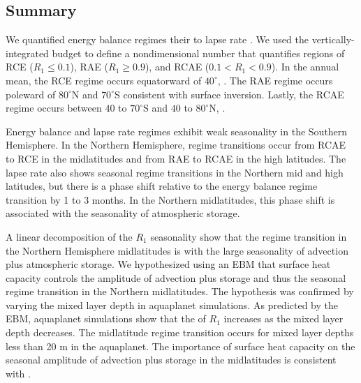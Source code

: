 \documentclass{ametsocV5}
\begin{document}
\subsection{Summary}
We quantified energy balance regimes  their  to lapse rate  . We used the vertically-integrated  budget to define a nondimensional number  that quantifies regions of RCE ($R_1\le0.1$), RAE ($R_1\ge0.9$), and RCAE ($0.1<R_1<0.9$). In the annual mean, the RCE regime occurs equatorward of $40^\circ$, . The RAE regime occurs poleward of $80^\circ$N and $70^\circ$S\added{,} consistent with  surface inversion. Lastly, the RCAE regime occurs between $40$ to $70^\circ$S and $40$ to $80^\circ$N, .

Energy balance and lapse rate regimes exhibit weak seasonality in the Southern Hemisphere. In the Northern Hemisphere, regime transitions occur from RCAE to RCE in the midlatitudes and from RAE to RCAE in the high latitudes. The lapse rate also shows seasonal regime transitions in the Northern mid and high latitudes, but there is a phase shift relative to the energy balance regime transition by 1 to 3 months. In the Northern midlatitudes, this phase shift is associated with the seasonality of atmospheric storage.

A linear decomposition of the $R_1$ seasonality show that the regime transition in the Northern Hemisphere midlatitudes is  with the large seasonality of advection plus atmospheric storage. We hypothesized using an EBM that surface heat capacity controls the amplitude of advection plus storage and thus the seasonal regime transition in the Northern midlatitudes. The hypothesis was confirmed by varying the mixed layer depth in aquaplanet simulations. As predicted by the EBM, aquaplanet simulations show that the  of $R_1$ increases as the mixed layer depth decreases. The midlatitude regime transition occurs for mixed layer depths less than 20 m in the aquaplanet. The importance of surface heat capacity on the seasonal amplitude of advection plus storage in the midlatitudes is consistent with \cite{barpanda2020}.
\end{document}
